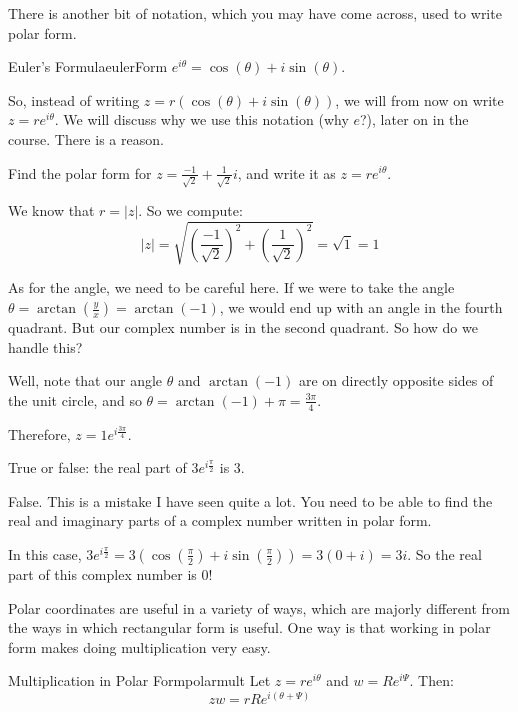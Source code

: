 There is another bit of notation, which you may have come across, used to write polar form.

\begin{defbo}{Euler's Formula}{eulerForm} 
$e^{i\theta} = \cos(\theta) + i\sin(\theta)$.
\end{defbo}

So, instead of writing $z = r(\cos(\theta) + i\sin(\theta))$, we will from now on write $z = re^{i\theta}$. We will discuss why we use this notation (why $e$?), later on in the course. There is a reason.

\begin{ex}{}{} Find the polar form for $z = \frac{-1}{\sqrt{2}} + \frac{1}{\sqrt{2}}i$, and write it as $z = re^{i\theta}$.

We know that $r = |z|$. So we compute:
$$|z| = \sqrt{\left(\frac{-1}{\sqrt{2}}\right)^2 + \left(\frac{1}{\sqrt{2}}\right)^2} = \sqrt{1} = 1$$

As for the angle, we need to be careful here. If we were to take the angle $\theta = \arctan\left(\frac{y}{x}\right) = \arctan(-1)$, we would end up with an angle in the fourth quadrant. But our complex number is in the second quadrant. So how do we handle this?

Well, note that our angle $\theta$ and $\arctan(-1)$ are on directly opposite sides of the unit circle, and so $\theta = \arctan(-1) + \pi = \frac{3 \pi}{4}$.

Therefore, $z = 1e^{i\frac{3\pi}{4}}$.

\end{ex}

\begin{ex}{}{} True or false: the real part of $3e^{i\frac{\pi}{2}}$ is $3$.

False. This is a mistake I have seen quite a lot. You need to be able to find the real and imaginary parts of a complex number written in polar form.

In this case, $3e^{i\frac{\pi}{2}} = 3\left(\cos\left(\frac{\pi}{2}\right) + i\sin\left(\frac{\pi}{2}\right)\right) = 3(0 + i) = 3i$. So the real part of this complex number is 0!

\end{ex}

Polar coordinates are useful in a variety of ways, which are majorly different from the ways in which rectangular form is useful. One way is that working in polar form makes doing multiplication very easy.

\begin{thmbo}{Multiplication in Polar Form}{polarmult} 
 Let $z = re^{i\theta}$ and $w = Re^{i\Psi}$. Then:
$$zw = rRe^{i(\theta + \Psi)}$$
\end{thmbo}

